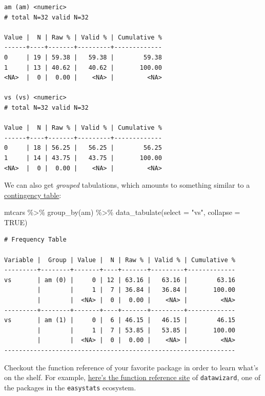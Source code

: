 \documentclass[
  letterpaper,
  DIV=11,
  numbers=noendperiod]{scrreprt}
\newenvironment{Shaded}{\begin{snugshade}}{\end{snugshade}}
\newcommand{\AttributeTok}[1]{\textcolor[rgb]{0.40,0.45,0.13}{#1}}
\newcommand{\ConstantTok}[1]{\textcolor[rgb]{0.56,0.35,0.01}{#1}}
\newcommand{\FunctionTok}[1]{\textcolor[rgb]{0.28,0.35,0.67}{#1}}
\newcommand{\NormalTok}[1]{\textcolor[rgb]{0.00,0.23,0.31}{#1}}
\newcommand{\SpecialCharTok}[1]{\textcolor[rgb]{0.37,0.37,0.37}{#1}}
\newcommand{\StringTok}[1]{\textcolor[rgb]{0.13,0.47,0.30}{#1}}
\theoremstyle{definition}
\theoremstyle{definition}
\theoremstyle{remark}
\begin{document}
\begin{verbatim}
am (am) <numeric>
# total N=32 valid N=32

Value |  N | Raw % | Valid % | Cumulative %
------+----+-------+---------+-------------
0     | 19 | 59.38 |   59.38 |        59.38
1     | 13 | 40.62 |   40.62 |       100.00
<NA>  |  0 |  0.00 |    <NA> |         <NA>

vs (vs) <numeric>
# total N=32 valid N=32

Value |  N | Raw % | Valid % | Cumulative %
------+----+-------+---------+-------------
0     | 18 | 56.25 |   56.25 |        56.25
1     | 14 | 43.75 |   43.75 |       100.00
<NA>  |  0 |  0.00 |    <NA> |         <NA>
\end{verbatim}

We can also get \emph{grouped} tabulations, which amounts to something
similar to a
\href{https://en.wikipedia.org/wiki/Contingency_table}{contingency
table}:

\begin{Shaded}
\begin{Highlighting}[]
\NormalTok{mtcars }\SpecialCharTok{\%\textgreater{}\%} 
  \FunctionTok{group\_by}\NormalTok{(am) }\SpecialCharTok{\%\textgreater{}\%} 
  \FunctionTok{data\_tabulate}\NormalTok{(}\AttributeTok{select =} \StringTok{"vs"}\NormalTok{, }\AttributeTok{collapse =} \ConstantTok{TRUE}\NormalTok{)}
\end{Highlighting}
\end{Shaded}

\begin{verbatim}
# Frequency Table

Variable |  Group | Value |  N | Raw % | Valid % | Cumulative %
---------+--------+-------+----+-------+---------+-------------
vs       | am (0) |     0 | 12 | 63.16 |   63.16 |        63.16
         |        |     1 |  7 | 36.84 |   36.84 |       100.00
         |        |  <NA> |  0 |  0.00 |    <NA> |         <NA>
---------+--------+-------+----+-------+---------+-------------
vs       | am (1) |     0 |  6 | 46.15 |   46.15 |        46.15
         |        |     1 |  7 | 53.85 |   53.85 |       100.00
         |        |  <NA> |  0 |  0.00 |    <NA> |         <NA>
---------------------------------------------------------------
\end{verbatim}

Checkout the function reference of your favorite package in order to
learn what's on the shelf. For example,
\href{https://easystats.github.io/datawizard/reference/index.html}{here's
the function reference site} of \texttt{datawizard}, one of the packages
in the \texttt{easystats} ecosystem.
\end{document}
